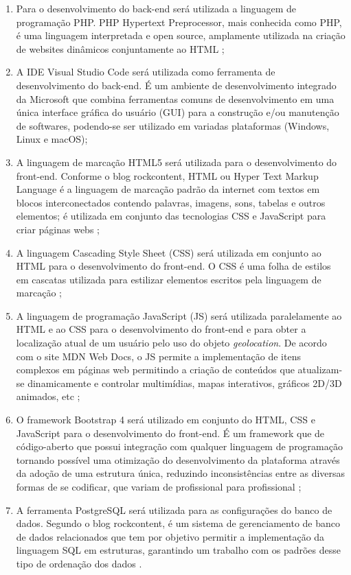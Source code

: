 \begin{enumerate}
\item  Para o desenvolvimento do back-end será utilizada a linguagem de programação PHP. PHP Hypertext Preprocessor, mais conhecida como PHP, é uma linguagem interpretada e open source, amplamente utilizada na criação de websites dinâmicos conjuntamente ao HTML \cite{php};
\item A IDE Visual Studio Code será utilizada como ferramenta de desenvolvimento do back-end. É um ambiente de desenvolvimento integrado da Microsoft que combina ferramentas comuns de desenvolvimento em uma única interface gráfica do usuário (GUI)\cite{ide2} para a construção e/ou manutenção de softwares, podendo-se ser utilizado em variadas plataformas (Windows, Linux e macOS)\cite{ide}; 
\item A linguagem de marcação HTML5 será utilizada para o desenvolvimento do front-end. Conforme o blog rockcontent, HTML ou Hyper Text Markup Language é a linguagem de marcação padrão da internet com textos em blocos interconectados contendo palavras, imagens, sons, tabelas e outros elementos; é utilizada em conjunto das tecnologias CSS e JavaScript para criar páginas webs \cite{html};
\item A linguagem Cascading Style Sheet (CSS) será utilizada em conjunto ao HTML para o desenvolvimento do front-end. O CSS é uma folha de estilos em cascatas utilizada para estilizar elementos escritos pela linguagem de marcação \cite{css};
\item A linguagem de programação JavaScript (JS) será utilizada paralelamente ao HTML e ao CSS para o desenvolvimento do front-end e para obter a localização atual de um usuário pelo uso do objeto \textit{geolocation}. De acordo com o site MDN Web Docs, o JS permite a implementação de itens complexos em páginas web permitindo a criação de conteúdos que atualizam-se dinamicamente e controlar multimídias, mapas interativos, gráficos 2D/3D animados, etc \cite{js};
\item O framework Bootstrap 4 será utilizado em conjunto do HTML, CSS e JavaScript para o desenvolvimento do front-end. É um framework que de código-aberto que possui integração com qualquer linguagem de programação tornando possível uma otimização do desenvolvimento da plataforma através da adoção de uma estrutura única, reduzindo inconsistências entre as diversas formas de se codificar, que variam de profissional para profissional \cite{bootstrap};
\item A ferramenta PostgreSQL será utilizada para as configurações do banco de dados. Segundo o blog rockcontent, é um sistema de gerenciamento de banco de dados relacionados que tem por objetivo permitir a implementação da linguagem SQL em estruturas, garantindo um trabalho com os padrões desse tipo de ordenação dos dados \cite{postgre}.
\end{enumerate}

